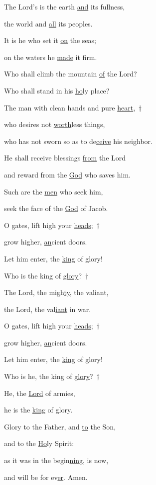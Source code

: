 \noindent The Lord’s is the earth \uline{and} its fullness,~\GreStar{}~\nopagebreak

the world and \uline{all} its peoples.

\noindent It is he who set it \uline{on} the seas;~\GreStar{}~\nopagebreak

on the waters he \uline{made} it firm.

\noindent Who shall climb the mountain \uline{of} the Lord?~\GreStar{}~\nopagebreak

Who shall stand in his \uline{ho}ly place?

\noindent The man with clean hands and pure \uline{heart},~†~\nopagebreak

who desires not \uline{worth}less things,~\GreStar{}~\nopagebreak

who has not sworn so as to de\uline{ceive} his neighbor.

\noindent He shall receive blessings \uline{from} the Lord~\GreStar{}~\nopagebreak

and reward from the \uline{God} who saves him.

\noindent Such are the \uline{men} who seek him,~\GreStar{}~\nopagebreak

seek the face of the \uline{God} of Jacob.

\noindent O gates, lift high your \uline{heads};~†~\nopagebreak

grow higher, \uline{an}cient doors.~\GreStar{}~\nopagebreak

Let him enter, the \uline{king} of glory!

\noindent Who is the king of \uline{glory}?~†~\nopagebreak

The Lord, the migh\uline{ty}, the valiant,~\GreStar{}~\nopagebreak

the Lord, the val\uline{iant} in war.

\noindent O gates, lift high your \uline{heads};~†~\nopagebreak

grow higher, \uline{an}cient doors.~\GreStar{}~\nopagebreak

Let him enter, the \uline{king} of glory!

\noindent Who is he, the king of \uline{glory}?~†~\nopagebreak

He, the \uline{Lord} of armies,~\GreStar{}~\nopagebreak

he is the \uline{king} of glory.

\noindent Glory to the Father, and \uline{to} the Son,~\GreStar{}~\nopagebreak

and to the \uline{Ho}ly Spirit:

\noindent as it was in the begin\uline{ning}, is now,~\GreStar{}~\nopagebreak

and will be for ev\uline{er}. Amen.
